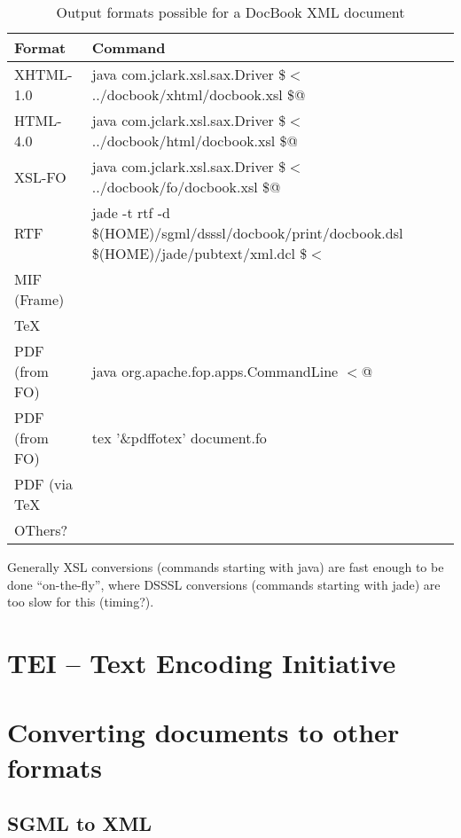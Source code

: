 \begin{table}[htbp]
  \begin{center}
    \begin{tabular}[tb]{|l|p{12cm}|}
\hline\hline
Format & Command \\
\hline
  XHTML-1.0 & java com.jclark.xsl.sax.Driver \$$<$ ../docbook/xhtml/docbook.xsl \$@\\
  HTML-\textsf{4.0} & java com.jclark.xsl.sax.Driver \$$<$
  ../docbook/html/docbook.xsl \$@ \\

  XSL-FO & java com.jclark.xsl.sax.Driver \$$<$ ../docbook/fo/docbook.xsl \$@ \\
  RTF & jade -t rtf -d \$(HOME)/sgml/dsssl/docbook/print/docbook.dsl \$(HOME)/jade/pubtext/xml.dcl \$$<$\\
  MIF (Frame) & \\
  {\TeX} & \\
  PDF (from FO) & java org.apache.fop.apps.CommandLine $< $@\\
  PDF (from FO) & tex '\&pdffotex' document.fo \\
  PDF (via {\TeX} & \\
  OThers? & \\
\hline
    \end{tabular}
    \caption{Output formats possible for a DocBook XML document}
    \label{tab:output-formats-possible-for-a-docbook-xml-document}
  \end{center}
\end{table}

Generally XSL conversions (commands starting with java) are fast
enough to be done ``on-the-fly'', where DSSSL conversions (commands
starting with jade) are \textsf{too slow for this (timing?)}.


\section{TEI -- Text Encoding Initiative}
\label{sec:tei}



\section{Converting documents to other formats}
\label{sec:docbook-converting-documents-to-other-formats}


\subsection{SGML to XML}
\label{docbook-converting-sgml-to-xml}

